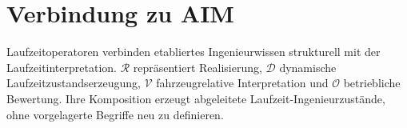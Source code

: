 \section{Verbindung zu AIM}
\begin{summary}
Laufzeitoperatoren verbinden etabliertes Ingenieurwissen strukturell mit der
Laufzeitinterpretation. \(\mathcal R\) repräsentiert Realisierung,
\(\mathcal D\) dynamische Laufzeitzustandserzeugung, \(\mathcal V\)
fahrzeugrelative Interpretation und \(\mathcal O\) betriebliche Bewertung.
Ihre Komposition erzeugt abgeleitete Laufzeit-Ingenieurzustände, ohne
vorgelagerte Begriffe neu zu definieren.
\end{summary}
